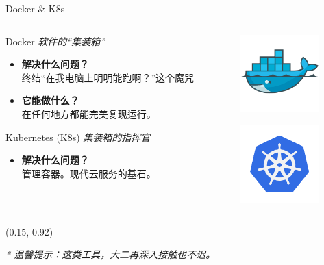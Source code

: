 \documentclass{beamer}
\begin{document}
\begin{frame}{Docker \& K8s}
    \begin{columns}[T]
        \begin{column}{0.6\textwidth}
            \huge Docker
            \large\textit{软件的“集装箱”}
            \begin{itemize}
                \item  \textbf{解决什么问题？} \\
                \small 终结“在我电脑上明明能跑啊？”这个魔咒
                \item \textbf{它能做什么？} \\
                \small 在任何地方都能完美复现运行。
            \end{itemize}
            
            \vspace{0.5cm}
            
            \huge Kubernetes (K8s)
            \large\textit{集装箱的指挥官}
            \begin{itemize}
                \item  \textbf{解决什么问题？} \\
                \small 管理容器。现代云服务的基石。
            \end{itemize}
        \end{column}
        
        \begin{column}{0.4\textwidth}
            \begin{figure}
                \centering
                \includegraphics[height=3cm]{assets/Docker.png}
            \end{figure}
            

            \begin{figure}
                \centering
                \includegraphics[height=3cm]{assets/k8s.png}
            \end{figure}
        \end{column}
    \end{columns}
    \begin{textblock*}{8cm}(0.15\paperwidth, 0.92\paperheight) %
        \begin{flushright}
            \small\textit{* 温馨提示：这类工具，大二再深入接触也不迟。}
        \end{flushright}
    \end{textblock*}
\end{frame}
\end{document}
